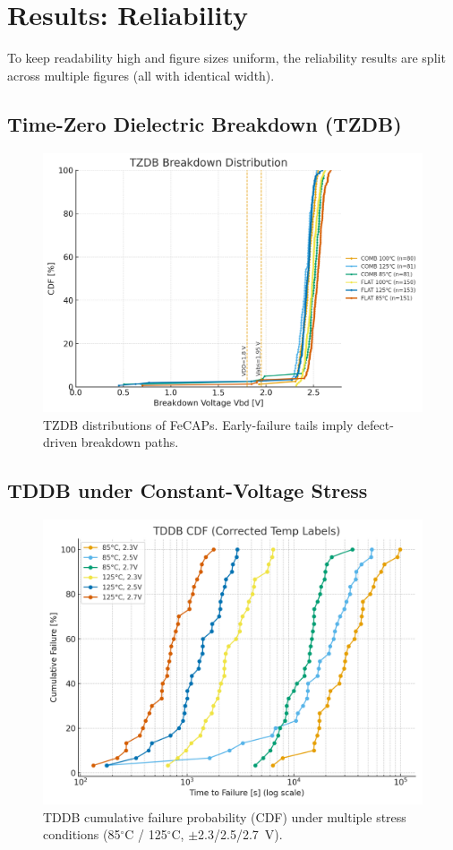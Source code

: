 \documentclass[conference]{IEEEtran}
\newcommand{\figw}{0.90\linewidth}
\begin{document}
\section{Results: Reliability}
To keep readability high and figure sizes uniform, the reliability results are split across multiple figures (all with identical width).

\subsection{Time-Zero Dielectric Breakdown (TZDB)}
\begin{figure}[!t]
  \centering
  \includegraphics[width=\figw]{figures/fig3_tzdb.png}
  \caption{TZDB distributions of FeCAPs. Early-failure tails imply defect-driven breakdown paths.}
  \label{fig:tzdb}
\end{figure}

\subsection{TDDB under Constant-Voltage Stress}
\begin{figure}[!t]
  \centering
  \includegraphics[width=\figw]{figures/fig4_tddb_cdf.png}
  \caption{TDDB cumulative failure probability (CDF) under multiple stress conditions (85$^\circ$C / 125$^\circ$C, $\pm$2.3/2.5/2.7~V).}
  \label{fig:tddb_cdf}
\end{figure}
\end{document}

